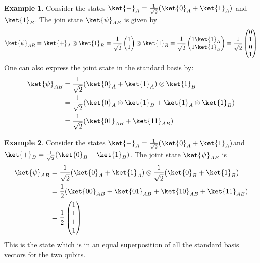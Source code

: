 \documentclass[12pt, oneside]{book}
\theoremstyle{definition}
\theoremstyle{definition}
\newtheorem{example}{Example}[section]
\theoremstyle{remark}
\begin{document}
\begin{example}
    Consider the states $\ket{+}_A = \frac{1}{\sqrt{2}}(\ket{0}_A+\ket{1}_A)$ and $\ket{1}_B$. The join state $\ket{\psi}_{AB}$ is given by
    \[
    \ket{\psi}_{AB}=\ket{+}_A\otimes \ket{1}_B  = \frac{1}{\sqrt{2}}\begin{pmatrix}1 \\ 1 \end{pmatrix} \otimes \ket{1}_B = \frac{1}{\sqrt{2}} \begin{pmatrix} 1 \ket{1}_B\\1\ket{1}_B \end{pmatrix} = \frac{1}{\sqrt{2}}\begin{pmatrix} 0 \\ 1 \\ 0 \\ 1 \end{pmatrix}
    \]
    One can also express the joint state in the standard basis by:
    \begin{align*}
    \ket{\psi}_{AB}&=\frac{1}{\sqrt{2}}(\ket{0}_A + \ket{1}_A )\otimes \ket{1}_B\\
    &=\frac{1}{\sqrt{2}}(\ket{0}_A \otimes \ket{1}_B+ \ket{1}_A \otimes \ket{1}_B )\\
    &=\frac{1}{\sqrt{2}}(\ket{01}_{AB}+\ket{11}_{AB})
    \end{align*}
\end{example}

\begin{example}
    Consider the states $\ket{+}_A=\frac{1}{\sqrt{2}}(\ket{0}_A+\ket{1}_A)$and $\ket{+}_B=\frac{1}{\sqrt{2}}(\ket{0}_B + \ket{1}_B)$. The joint state $\ket{\psi}_{AB}$ is
    \begin{align*}
    \ket{\psi}_{AB}&=\frac{1}{\sqrt{2}}(\ket{0}_A+\ket{1}_A)\otimes \frac{1}{\sqrt{2}} (\ket{0}_B+\ket{1}_B)\\
    &=\frac{1}{2}(\ket{00}_{AB}+\ket{01}_{AB}+\ket{10}_{AB}+\ket{11}_{AB})\\
    &=\frac{1}{2}\begin{pmatrix} 1 \\ 1 \\ 1 \\ 1 \end{pmatrix}
    \end{align*}
    This is the state which is in an equal superposition of all the standard basis vectors for the two qubits.
\end{example}
\end{document}
